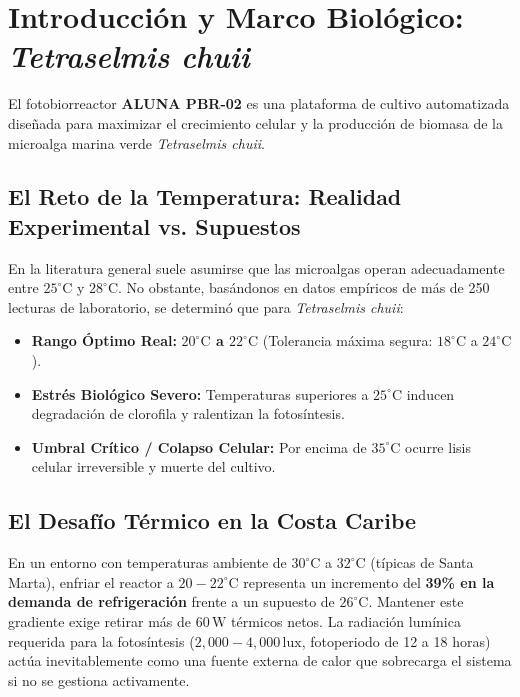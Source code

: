 \documentclass[11pt,letterpaper]{article}
\begin{document}
\tableofcontents
\newpage

\section{Introducción y Marco Biológico: \textit{Tetraselmis chuii}}

El fotobiorreactor \textbf{ALUNA PBR-02} es una plataforma de cultivo automatizada diseñada para maximizar el crecimiento celular y la producción de biomasa de la microalga marina verde \textit{Tetraselmis chuii}. 

\subsection{El Reto de la Temperatura: Realidad Experimental vs. Supuestos}
En la literatura general suele asumirse que las microalgas operan adecuadamente entre $25^\circ\text{C}$ y $28^\circ\text{C}$. No obstante, basándonos en datos empíricos de más de 250 lecturas de laboratorio, se determinó que para \textit{Tetraselmis chuii}:
\begin{itemize}
    \item \textbf{Rango Óptimo Real:} \textbf{$20^\circ\text{C}$ a $22^\circ\text{C}$} (Tolerancia máxima segura: $18^\circ\text{C}$ a $24^\circ\text{C}$).
    \item \textbf{Estrés Biológico Severo:} Temperaturas superiores a $25^\circ\text{C}$ inducen degradación de clorofila y ralentizan la fotosíntesis.
    \item \textbf{Umbral Crítico / Colapso Celular:} Por encima de $35^\circ\text{C}$ ocurre lisis celular irreversible y muerte del cultivo.
\end{itemize}

\subsection{El Desafío Térmico en la Costa Caribe}
En un entorno con temperaturas ambiente de $30^\circ\text{C}$ a $32^\circ\text{C}$ (típicas de Santa Marta), enfriar el reactor a $20-22^\circ\text{C}$ representa un incremento del \textbf{39\% en la demanda de refrigeración} frente a un supuesto de $26^\circ\text{C}$. Mantener este gradiente exige retirar más de $60\,\text{W}$ térmicos netos. La radiación lumínica requerida para la fotosíntesis ($2,000 - 4,000\,\text{lux}$, fotoperiodo de 12 a 18 horas) actúa inevitablemente como una fuente externa de calor que sobrecarga el sistema si no se gestiona activamente.
\end{document}
